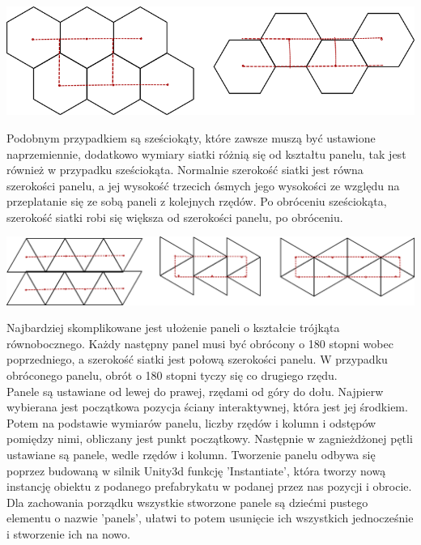 \documentclass{article} %
\begin{document}
            \begin{center}
                \includegraphics[scale=0.3]{images/diagrams/panel_tiling_hexagon.png}
            \end{center}
            
            Podobnym przypadkiem są sześciokąty, które zawsze muszą być ustawione naprzemiennie, dodatkowo wymiary siatki różnią się od kształtu panelu, tak jest również w przypadku sześciokąta. Normalnie szerokość siatki jest równa szerokości panelu, a jej wysokość trzecich ósmych jego wysokości ze względu na przeplatanie się ze sobą paneli z kolejnych rzędów. Po obróceniu sześciokąta, szerokość siatki robi się większa od szerokości panelu, po obróceniu.
            \\
            
            \begin{center}
                \includegraphics[scale=0.25]{images/diagrams/panel_tiling_triangles.png}
            \end{center}

            Najbardziej skomplikowane jest ułożenie paneli o kształcie trójkąta równobocznego. Każdy następny panel musi być obrócony o 180 stopni wobec poprzedniego, a szerokość siatki jest połową szerokości panelu. W przypadku obróconego panelu, obrót o 180 stopni tyczy się co drugiego rzędu.  
            \\
            
            Panele są ustawiane od lewej do prawej, rzędami od góry do dołu. Najpierw wybierana jest początkowa pozycja ściany interaktywnej, która jest jej środkiem. Potem na podstawie wymiarów panelu, liczby rzędów i kolumn i odstępów pomiędzy nimi, obliczany jest punkt początkowy. Następnie w zagnieżdżonej pętli ustawiane są panele, wedle rzędów i kolumn. Tworzenie panelu odbywa się poprzez budowaną w silnik Unity3d funkcję 'Instantiate', która tworzy nową instancję obiektu z podanego prefabrykatu w podanej przez nas pozycji i obrocie. Dla zachowania porządku wszystkie stworzone panele są dziećmi pustego elementu o nazwie 'panels', ułatwi to potem usunięcie ich wszystkich jednocześnie i stworzenie ich na nowo.
            \\
            
\end{document}
